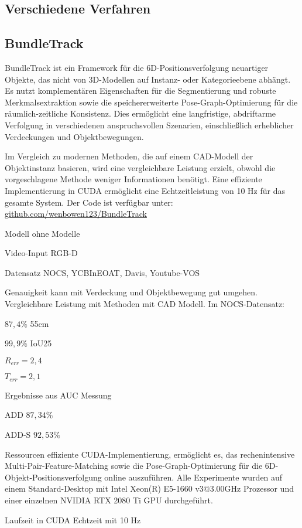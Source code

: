 \documentclass[a4paper, 11pt]{article}
\begin{document}
\begin{multicols*}{2}
    \section{Verschiedene Verfahren}
    \subsection{BundleTrack}
    BundleTrack\cite{BundleTrack} ist ein Framework für die 6D-Positionsverfolgung neuartiger Objekte, das nicht von 3D-Modellen auf Instanz- oder Kategorieebene abhängt. Es nutzt komplementären Eigenschaften für die Segmentierung und robuste Merkmalsextraktion sowie die speichererweiterte Pose-Graph-Optimierung für die räumlich-zeitliche Konsistenz. Dies ermöglicht eine langfristige, abdriftarme Verfolgung in verschiedenen anspruchsvollen Szenarien, einschließlich erheblicher Verdeckungen und Objektbewegungen.

    Im Vergleich zu modernen Methoden, die auf einem CAD-Modell der Objektinstanz basieren, wird eine vergleichbare Leistung erzielt, obwohl die vorgeschlagene Methode weniger Informationen benötigt. Eine effiziente Implementierung in CUDA ermöglicht eine Echtzeitleistung von 10 Hz für das gesamte System.
    Der Code ist verfügbar unter: \href{https://github.com/wenbowen123/BundleTrack}{github.com/wenbowen123/BundleTrack}

    \begin{description*}
        \item[Modell] ohne Modelle
        \item[Video-Input] RGB-D
        \item[Datensatz] \Gls{NOCS}, \Gls{YCBInEOAT}, Davis\cite{Davis}, Youtube-VOS\cite{Youtube-vos}
        \item[Genauigkeit] kann mit Verdeckung und Objektbewegung gut umgehen. Vergleichbare Leistung mit Methoden mit CAD Modell. Im \Gls{NOCS}-Datensatz:
        \begin{itemize*}
            \item $87,4\%$ \Gls{55cm}
            \item $99,9\%$ \Gls{IoU25}
            \item $R_{err}=2,4$
            \item $T_{err}=2,1$
        \end{itemize*}
        Ergebnisse aus \Gls{AUC} Messung
        \begin{itemize*}
            \item ADD $87,34\%$
            \item ADD-S $92,53\%$
        \end{itemize*}
        \item[Ressourcen] effiziente CUDA-Implementierung, ermöglicht es, das rechenintensive Multi-Pair-Feature-Matching sowie die Pose-Graph-Optimierung für die 6D-Objekt-Positionsverfolgung online auszuführen. Alle Experimente wurden auf einem Standard-Desktop mit Intel Xeon(R) E5-1660 v3@3.00GHz Prozessor und einer einzelnen NVIDIA RTX 2080 Ti GPU durchgeführt.
        \item[Laufzeit] in CUDA Echtzeit mit 10 Hz
    \end{description*}


\end{multicols*}
\end{document}
